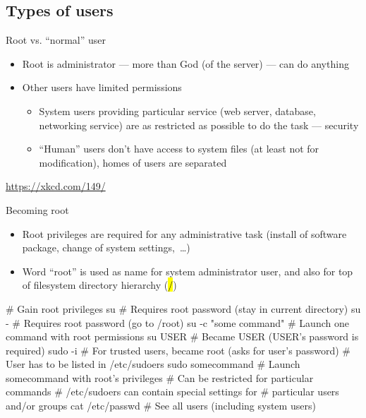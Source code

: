 \documentclass[compress, ucs, xelatex, 11pt, xcolor=svgnames, aspectratio=169,
	hyperref={
		bookmarks=true,
		unicode=true,
		colorlinks=true,
		pdftitle={Linux, command line and MetaCentrum},
		plainpages=false,
		pdfauthor={Vojtech Zeisek},
		pdfsubject={Course about use of Linux command line, writing shell scripts and using MetaCentrum of CESNET},
		pdfcreator={XeLaTeX},
		pdfkeywords={Linux, GNU, BASH, shell, command line, MetaCentrum},
		linkcolor=DarkRed, %
		anchorcolor=DarkBlue, %
		citecolor=Indigo, %
		filecolor=NavyBlue, %
		menucolor=DarkMagenta, %
		urlcolor=DarkBlue, %
		pdftex},
	url={hyphens, lowtilde} %
	]{beamer}
\renewcommand{\texttt}[1]{\hl{\ttfamily #1}}
\begin{document}
\subsection{Types of users}

\begin{frame}{Root vs. \enquote{normal} user}
	\label{root}
	\begin{itemize}
		\item Root is administrator --- more than God (of the server) --- can do anything
		\item Other users have limited permissions
		\begin{itemize}
			\item System users providing particular service (web server, database, networking service) are as restricted as possible to do the task --- security
			\item \enquote{Human} users don't have access to system files (at least not for modification), homes of users are separated
		\end{itemize}
	\end{itemize}
	\begin{center}
		\texttt{[image: sandwich.png]}
	\end{center}
	\begin{flushright}
		\url{https://xkcd.com/149/}
	\end{flushright}
\end{frame}

\begin{frame}[fragile]{Becoming root}
	\begin{itemize}
		\item Root privileges are required for any administrative task (install of software package, change of system settings,~\ldots)
		\item Word \enquote{root} is used as name for system administrator user, and also for top of filesystem directory hierarchy (\texttt{/})
	\end{itemize}
	\begin{bashcode}
    # Gain root privileges
    su # Requires root password (stay in current directory)
    su - # Requires root password (go to /root)
    su -c "some command" # Launch one command with root permissions
    su USER # Became USER (USER's password is required)
    sudo -i # For trusted users, became root (asks for user's password)
            # User has to be listed in /etc/sudoers
    sudo somecommand # Launch somecommand with root's privileges
                     # Can be restricted for particular commands
                     # /etc/sudoers can contain special settings for
                     # particular users and/or groups
    cat /etc/passwd # See all users (including system users)
	\end{bashcode}
\end{frame}
\end{document}
